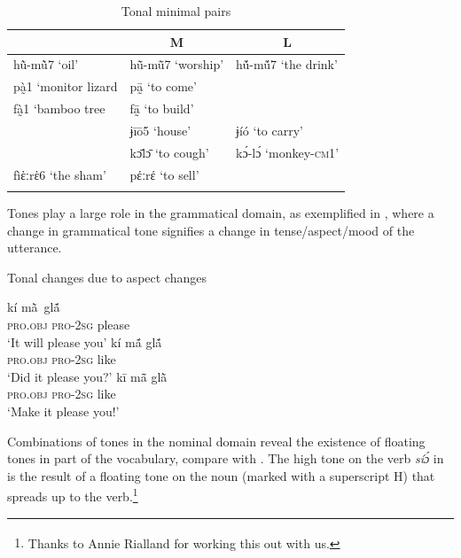 \documentclass[output=paper]{langscibook}
\begin{document}
\begin{table}
\caption{Tonal minimal pairs\label{tab:traore:minimal_pairs:3}}
\begin{tabular}{lll}
 \lsptoprule
 \multicolumn{1}{c}{H} & \multicolumn{1}{c}{M} & \multicolumn{1}{c}{L} \\\midrule
hũ̀-mũ̀7  ‘oil’ & hũ̄-mũ̄7 ‘worship’ & hṹ-mṹ7  ‘the drink’\\
 pà̰1 ‘monitor lizard & pā̰     ‘to come’ &  \\
 fà̰1 ‘bamboo tree &   fā̰      ‘to build’& \\
  &  ɉīō5  `house’ & ɉíó  ‘to carry’\\
  & kɔ̄lɔ̄   ‘to cough’ &  kɔ́-lɔ́ ‘monkey-\textsc{cm1}’\\
  fìὲːrὲ6  ‘the sham’ & pέːrέ  ‘to sell’ \\\lspbottomrule
\end{tabular}
\end{table}

Tones play a large role in the grammatical domain, as exemplified in , where a change in grammatical tone signifies a change in tense/aspect/mood of the utterance. 

\begin{exe}
    \ex Tonal changes due to aspect changes \label{ex:traore:tonal_change_aspect_change:1}
    \begin{xlist}
     \ex \gll kí              {mã̀ }           glã́ \\
         \textsc{pro}.\textsc{obj}     \textsc{pro}{}-2\textsc{sg}    please\\
         \trans `It will please you'
    \ex \gll  kí               mã́             glã́ \\
            \textsc{pro}.\textsc{obj}     \textsc{pro}{}-2\textsc{sg}   like\\
            \trans `Did it please you?'
    \ex \gll kī              mã̄              glã̀ \\
        \textsc{pro}.\textsc{obj}    \textsc{pro}{}-2\textsc{sg}   like\\
        \trans  `Make it please you!'
    \end{xlist}

\end{exe}

Combinations of tones in the nominal domain reveal the existence of floating tones in part of the vocabulary, compare  with . The high tone on the verb \textit{síɔ́} in  is the result of a floating tone on the noun (marked with a superscript H) that spreads up to the verb.\footnote{\textsuperscript{} Thanks to Annie Rialland for working this out with us.}  
\end{document}
